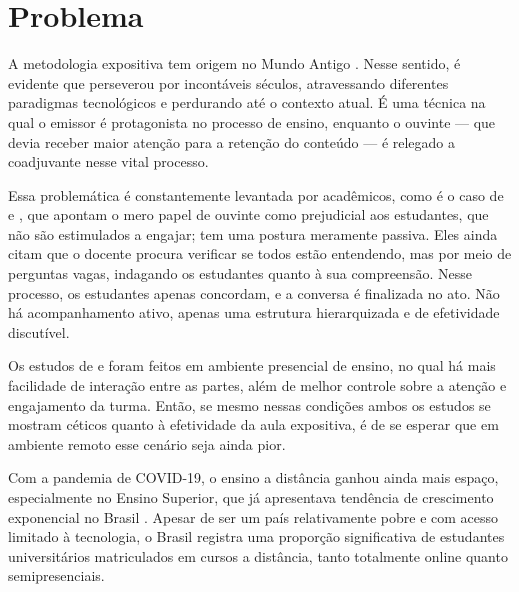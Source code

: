 \section{Problema}
A metodologia expositiva tem origem no Mundo Antigo \cite{andreataAulaExpositivaPaulo2019}. Nesse sentido, é evidente que perseverou por incontáveis séculos, atravessando diferentes paradigmas tecnológicos e perdurando até o contexto atual. É uma técnica na qual o emissor é protagonista no processo de ensino, enquanto o ouvinte --- que devia receber maior atenção para a retenção do conteúdo --- é relegado a coadjuvante nesse vital processo.

Essa problemática é constantemente levantada por acadêmicos, como é o caso de  e , que apontam o mero papel de ouvinte como prejudicial aos estudantes, que não são estimulados a engajar; tem uma postura meramente passiva. Eles ainda citam que o docente procura verificar se todos estão entendendo, mas por meio de perguntas vagas, indagando os estudantes quanto à sua compreensão. Nesse processo, os estudantes apenas concordam, e a conversa é finalizada no ato. Não há acompanhamento ativo, apenas uma estrutura hierarquizada e de efetividade discutível.

Os estudos de  e  foram feitos em ambiente presencial de ensino, no  qual há mais facilidade de interação entre as partes, além de melhor controle sobre a atenção e engajamento da turma. Então, se mesmo nessas condições ambos os estudos se mostram céticos quanto à efetividade da aula expositiva, é de se esperar que em ambiente remoto esse cenário seja ainda pior.

Com a pandemia de COVID-19, o ensino a distância ganhou ainda mais espaço, especialmente no Ensino Superior, que já apresentava tendência de crescimento exponencial no Brasil \cite{moranEnsinoSuperiorDistancia2009}. Apesar de ser um país relativamente pobre e com acesso limitado à tecnologia, o Brasil registra uma proporção significativa de estudantes universitários matriculados em cursos a distância, tanto totalmente online quanto semipresenciais.
